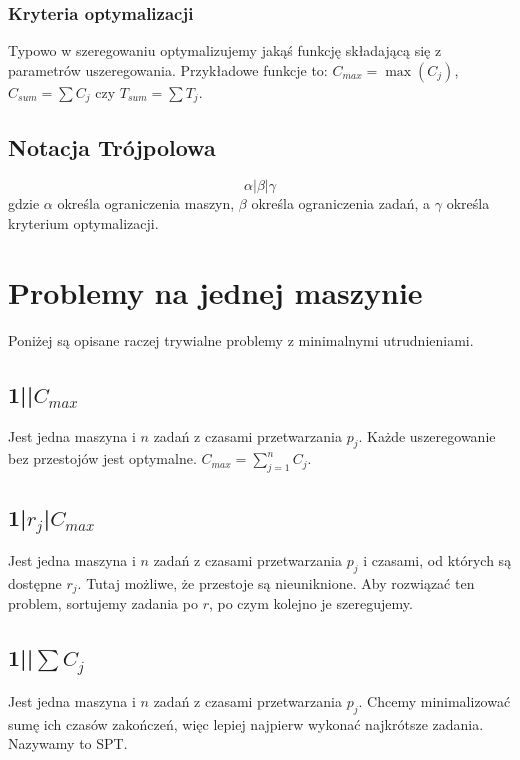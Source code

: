 \documentclass{../notatki}
\begin{document}
\subsubsection{Kryteria optymalizacji}

Typowo w szeregowaniu optymalizujemy jakąś funkcję składającą się z
parametrów uszeregowania. Przykładowe funkcje to:
$C_{max}=\max(C_j)$, $C_{sum} = \sum C_j$ czy $T_{sum} = \sum T_j$.

\subsection{Notacja Trójpolowa}

$$
\alpha | \beta | \gamma
$$
gdzie $\alpha$ określa ograniczenia maszyn, $\beta$ określa ograniczenia
zadań, a $\gamma$ określa kryterium optymalizacji.

\section{Problemy na jednej maszynie}

Poniżej są opisane raczej trywialne problemy z minimalnymi utrudnieniami.

\subsection{1||\texorpdfstring{$C_{max}$}{Cmax}}

Jest jedna maszyna i $n$ zadań z czasami przetwarzania $p_j$.
Każde uszeregowanie bez przestojów jest optymalne. $C_{max} = \sum_{j=1}^n C_j$.

\subsection{
1|\texorpdfstring{$r_j$}{rj}|\texorpdfstring{$C_{max}$}{Cmax}}

Jest jedna maszyna i $n$ zadań z czasami przetwarzania $p_j$ i
czasami, od których są dostępne $r_j$. Tutaj możliwe, że przestoje są
nieuniknione. Aby rozwiązać ten problem, sortujemy zadania po $r$, po czym
kolejno je szeregujemy.

\subsection{1||\texorpdfstring{$\sum C_j$}{sum Cj}}

Jest jedna maszyna i $n$ zadań z czasami przetwarzania $p_j$.
Chcemy minimalizować sumę ich czasów zakończeń, więc lepiej najpierw wykonać
najkrótsze zadania. Nazywamy to SPT.
\end{document}
